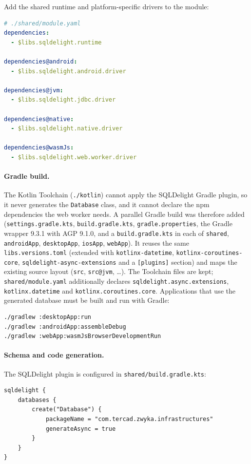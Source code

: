 Add the shared runtime and platform-specific drivers to the module:

\begin{lstlisting}[language=yaml]
# ./shared/module.yaml
dependencies:
  - $libs.sqldelight.runtime

dependencies@android:
  - $libs.sqldelight.android.driver

dependencies@jvm:
  - $libs.sqldelight.jdbc.driver

dependencies@native:
  - $libs.sqldelight.native.driver

dependencies@wasmJs:
  - $libs.sqldelight.web.worker.driver
\end{lstlisting}

\paragraph{Gradle build.}
The Kotlin Toolchain (\texttt{./kotlin}) cannot apply the SQLDelight Gradle plugin, so it never
generates the \texttt{Database} class, and it cannot declare the npm dependencies the web
worker needs. A parallel Gradle build was therefore added (\texttt{settings.gradle.kts},
\texttt{build.gradle.kts}, \texttt{gradle.properties}, the Gradle wrapper 9.3.1 with AGP 9.1.0,
and a \texttt{build.gradle.kts} in each of \texttt{shared}, \texttt{androidApp},
\texttt{desktopApp}, \texttt{iosApp}, \texttt{webApp}). It reuses the same
\texttt{libs.versions.toml} (extended with \texttt{kotlinx-datetime},
\texttt{kotlinx-coroutines-core}, \texttt{sqldelight-async-extensions} and a \texttt{[plugins]}
section) and maps the existing source layout (\texttt{src}, \texttt{src@jvm}, \ldots).
The Toolchain files are kept; \texttt{shared/module.yaml} additionally declares
\texttt{sqldelight.async.extensions}, \texttt{kotlinx.datetime} and \texttt{kotlinx.coroutines.core}.
Applications that use the generated database must be built and run with Gradle:

\begin{lstlisting}[language=bash]
./gradlew :desktopApp:run
./gradlew :androidApp:assembleDebug
./gradlew :webApp:wasmJsBrowserDevelopmentRun
\end{lstlisting}

\paragraph{Schema and code generation.}
The SQLDelight plugin is configured in \texttt{shared/build.gradle.kts}:

\begin{lstlisting}
sqldelight {
    databases {
        create("Database") {
            packageName = "com.tercad.zwyka.infrastructures"
            generateAsync = true
        }
    }
}
\end{lstlisting}


